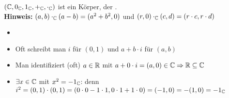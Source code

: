 \begin{satz}
	$(\mathbb{C},0_{\mathbb{C}},1_{\mathbb{C}},+_{\mathbb{C}},\cdot_{\mathbb{C}})$ ist ein Körper, der . \\
	\textbf{Hinweis:} $(a,b)\cdot_{\mathbb{C}}(a-b)=(a^{2}+b^{2},0)$ und $(r,0)\cdot_{\mathbb{C}}(c,d)=(r\cdot c, r\cdot d)$
\end{satz}

\begin{nota}
	\begin{itemize}
		\item[]
		\item Oft schreibt man $i$ für $(0,1)$ und $a+b\cdot i$ für $(a,b)$
		\item Man identifiziert (oft) $a\in\mathbb{R}$ mit $a+0\cdot i=(a,0)\in\mathbb{C}\Rightarrow\mathbb{R}\subseteq\mathbb{C}$
		\item $\exists x\in\mathbb{C}$ mit $x^{2}=-1_{\mathbb{C}}$: denn $i^{2}=(0,1)\cdot(0,1)=(0\cdot 0-1\cdot 1,0\cdot 1+1\cdot 0)=(-1,0)=-(1,0)=-1_{\mathbb{C}}$
	\end{itemize}
\end{nota}